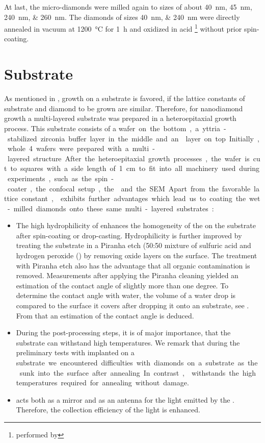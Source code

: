 			At last, the micro-diamonds were milled again to sizes of about \SIlist{40;45;240;260}{nm}.
		The diamonds of sizes \SIlist{40;240}{nm} were directly annealed in vacuum at \SI{1200}{\celsius} for \SI{1}{\hour} and oxidized in acid \footnote{performed by \muzha} without prior spin-coating.

\section{\Ir Substrate}\label{sec::ir_substrate}

	As mentioned in , growth on a substrate is favored, if the lattice constants of substrate and diamond to be grown are similar.
	Therefore, for \CVD nanodiamond growth a multi-layered substrate was prepared in a heteroepitaxial growth process.
	This substrate consists of a \si wafer on the bottom, a yttria-stabilized zirconia buffer layer in the middle and an \ir layer on top.
	Initially, whole \SI{4}{\inch} wafers were prepared with a multi-layered structure.
	After the heteroepitaxial growth processes, the wafer is cut to squares with a side length of \SI{1}{cm} to fit into all machinery used during experiments, such as the spin-coater, the confocal setup, the \fib and the SEM.

	Apart from the favorable lattice constant, \ir exhibits further advantages which lead us to coating the wet-milled diamonds onto these same multi-layered substrates:

	\begin{itemize}
		\item The high hydrophilicity of \ir enhances the homogeneity of the \nds on the substrate after spin-coating or drop-casting. Hydrophilicity is further improved by treating the substrate in a Piranha etch (50:50 mixture of sulfuric acid  and hydrogen peroxide () by removing oxide layers on the surface.
		The treatment with Piranha etch also has the advantage that all organic contamination is removed.
		Measurements after applying the Piranha cleaning yielded an estimation of the contact angle of slightly more than one degree.
		To determine the contact angle with water, the volume of a water drop is compared to the surface it covers after dropping it onto an \ir substrate, see . From that an estimation of the contact angle is deduced.
		\item During the post-processing steps, it is of major importance, that the substrate can withstand high temperatures.
		We remark that during the preliminary tests with implanted \nds on a \si substrate we encountered difficulties with diamonds on a \si substrate as the sunk into the surface after annealing.
		In contrast, \ir withstands the high temperatures required for annealing without damage.
		\item \Ir acts both as a mirror and as an antenna for the \fl light emitted by the \siv \cite{Neu2012a}.
		Therefore, the collection efficiency of the \fl light is enhanced.
	\end{itemize}


